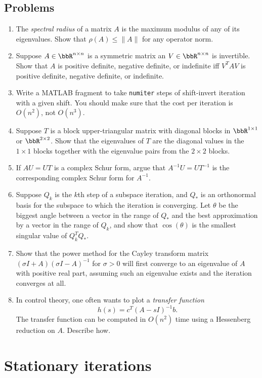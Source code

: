 \documentclass[12pt, leqno]{article}
\begin{document}
\subsection{Problems}

\begin{enumerate}
\item
  The {\em spectral radius} of a matrix $A$ is the maximum modulus
  of any of its eigenvalues.  Show that $\rho(A) \leq \|A\|$ for
  any operator norm.
\item
  Suppose $A \in \bbR^{n \times n}$ is a symmetric matrix an
  $V \in \bbR^{n \times n}$ is invertible.  Show that $A$ is positive
  definite, negative definite, or indefinite iff $V^T A V$ is positive
  definite, negative definite, or indefinite.
\item
  Write a MATLAB fragment to take {\tt numiter} steps of shift-invert iteration
  with a given shift.  You should make sure that the cost per
  iteration is $O(n^2)$, not $O(n^3)$.
\item
  Suppose $T$ is a block upper-triangular matrix with diagonal blocks
  in $\bbR^{1 \times 1}$ or $\bbR^{2 \times 2}$.  Show that the
  eigenvalues of $T$ are the diagonal values in the $1 \times 1$
  blocks together with the eigenvalue pairs from the $2 \times 2$
  blocks.
\item
  If $A U = U T$ is a complex Schur form, argue that
  $A^{-1} U = U T^{-1}$ is the corresponding complex Schur form for $A^{-1}$.
\item
  Suppose $Q_k$ is the $k$th step of a subspace iteration, and $Q_*$
  is an orthonormal basis for the subspace to which the iteration is
  converging.  Let $\theta$ be the biggest angle between a vector in
  the range of $Q_*$ and the best approximation by a vector in the
  range of $Q_k$, and show that $\cos(\theta)$ is the smallest singular
  value of $Q_k^T Q_*$.
\item
  Show that the power method for the Cayley transform matrix $(\sigma
  I + A) (\sigma I - A)^{-1}$ for $\sigma > 0$ will first converge to
  an eigenvalue of $A$ with positive real part, assuming such an
  eigenvalue exists and the iteration converges at all.
\item
  In control theory, one often wants to plot a {\em transfer function}
  \[
    h(s) = c^T (A-sI)^{-1} b.
  \]
  The transfer function can be computed in $O(n^2)$ time using a
  Hessenberg reduction on $A$.  Describe how.
\end{enumerate}

\newpage
\section{Stationary iterations}
\end{document}
